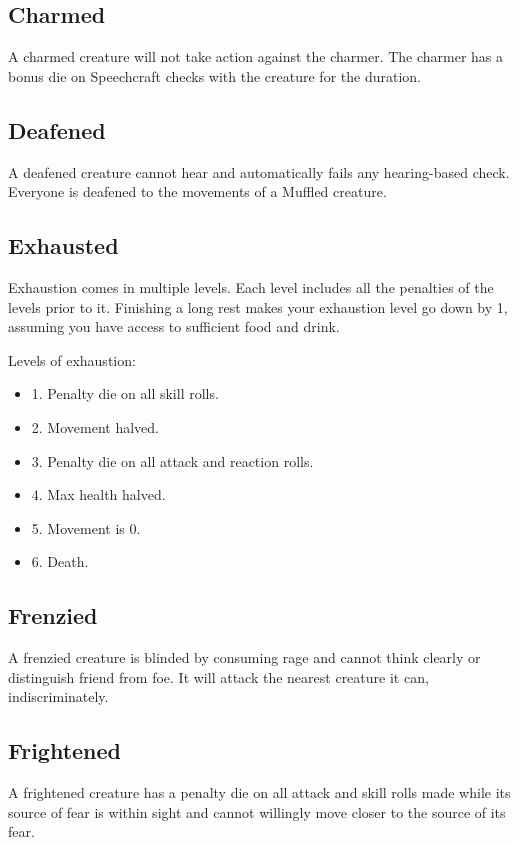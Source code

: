 \documentclass[12pt]{book}
\begin{document}
\subsection{Charmed}
A charmed creature will not take action against the charmer. The charmer has a bonus die on Speechcraft checks with the creature for the duration.

\subsection{Deafened}
A deafened creature cannot hear and automatically fails any hearing-based check. Everyone is deafened to the movements of a Muffled creature.

\subsection{Exhausted}
Exhaustion comes in multiple levels. Each level includes all the penalties of the levels prior to it. Finishing a long rest makes your exhaustion level go down by 1, assuming you have access to sufficient food and drink.

Levels of exhaustion:

\begin{itemize}
	\item 1. Penalty die on all skill rolls.
	\item 2. Movement halved.
	\item 3. Penalty die on all attack and reaction rolls.
	\item 4. Max health halved.
	\item 5. Movement is 0.
	\item 6. Death.
\end{itemize}

\subsection{Frenzied}
A frenzied creature is blinded by consuming rage and cannot think clearly or distinguish friend from foe. It will attack the nearest creature it can, indiscriminately.

\subsection{Frightened}
A frightened creature has a penalty die on all attack and skill rolls made while its source of fear is within sight and cannot willingly move closer to the source of its fear.
\end{document}
